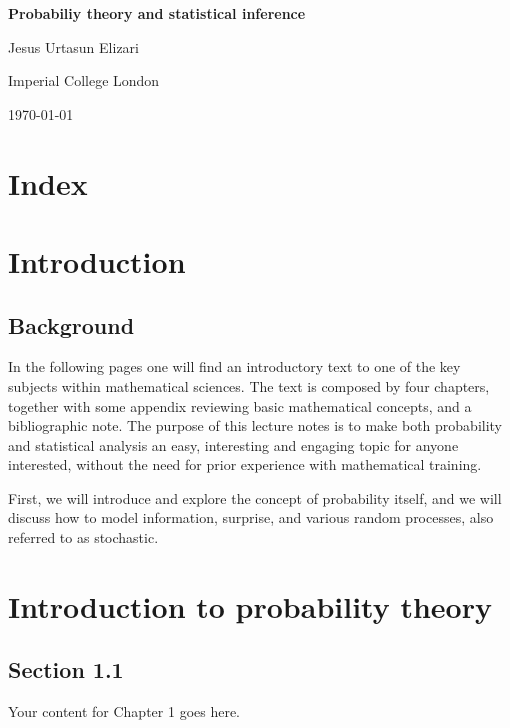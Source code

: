 \documentclass{book}
\begin{document}
\frontmatter

\begin{titlepage}
    \entering
    \vspace*{\fill}
    {\Huge\bfseries Probabiliy theory and statistical inference\par}
    \vspace{1cm}
    {\Large Jesus Urtasun Elizari\par}
    \vspace{1cm}
    {\Large Imperial College London\par}
    \vspace{1cm}
    {\large\today\par}
    \vspace*{\fill}
\end{titlepage}

\tableofcontents

\chapter*{Index}
\printindex

\mainmatter

\chapter*{Introduction}
\section{Background}
In the following pages one will find an introductory text to one of the key subjects within mathematical sciences. The text is composed by four chapters, together with some appendix reviewing basic mathematical concepts, and a bibliographic note. The purpose of this lecture notes is to make both probability and statistical analysis an easy, interesting and engaging topic for anyone interested, without the need for prior experience with mathematical training.

First, we will introduce and explore the concept of probability itself, and we will discuss how to model information, surprise, and various random processes, also referred to as stochastic.

\chapter{Introduction to probability theory}
\section{Section 1.1}
Your content for Chapter 1 goes here.
\end{document}
